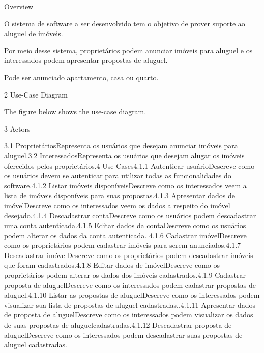 Overview

O sistema de software a ser desenvolvido tem o objetivo de prover suporte ao aluguel de imóveis.

Por meio desse sistema, proprietários podem anunciar imóveis para aluguel e os interessados podem apresentar propostas de aluguel. 

Pode ser anunciado apartamento, casa ou quarto.

2 Use-Case Diagram

The figure below shows the use-case diagram.

3 Actors

3.1 ProprietáriosRepresenta os usuários que desejam anunciar imóveis para aluguel.3.2 InteressadosRepresenta os usuários que desejam alugar os imóveis oferecidos pelos proprietários.4 Use Cases4.1.1 Autenticar usuárioDescreve como os usuários devem se autenticar para utilizar todas as funcionalidades do software.4.1.2 Listar imóveis disponíveisDescreve como os interessados  veem a lista de imóveis disponíveis para suas propostas.4.1.3 Apresentar dados de imóvelDescreve como os interessados veem os dados a respeito do imóvel desejado.4.1.4  Descadastrar contaDescreve como os usuários podem descadastrar uma conta autenticada.4.1.5 Editar dados da contaDescreve como os usuários podem alterar os dados da conta autenticada.
4.1.6 Cadastrar imóvelDescreve como os proprietários podem cadastrar imóveis para serem anunciados.4.1.7 Descadastrar imóvelDescreve como os proprietários podem descadastrar imóveis que foram cadastrados.4.1.8 Editar dados de imóvelDescreve como os proprietários podem alterar os dados dos imóveis cadastrados.4.1.9 Cadastrar proposta de aluguelDescreve como os interessados podem cadastrar propostas de aluguel.4.1.10 Listar as propostas de aluguelDescreve como os interessados podem visualizar sua lista de propostas de aluguel cadastradas..4.1.11  Apresentar dados de proposta de aluguelDescreve como os interessados podem visualizar os dados de suas propostas de aluguelcadastradas.4.1.12 Descadastrar proposta de aluguelDescreve como os interessados podem descadastrar suas propostas de aluguel cadastradas.